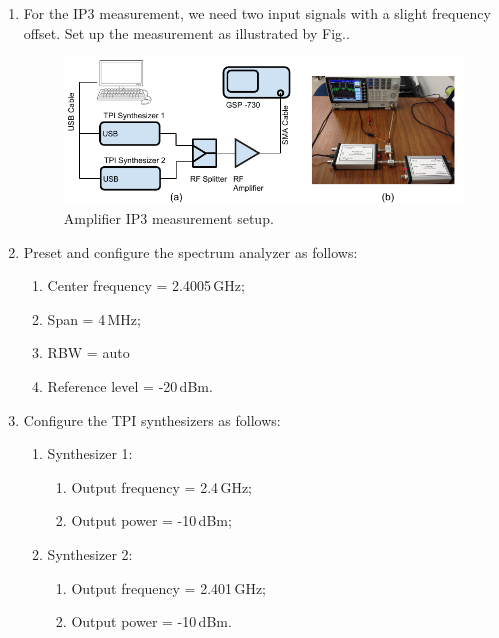 \documentclass[letterpaper, 11pt]{article}
\begin{document}
\begin{enumerate}
	\item For the IP3 measurement, we need two input signals with a slight frequency offset. Set up the measurement as illustrated by Fig..
		\begin{figure}[h]
			\centering
			\includegraphics[width=4.5in]{setup-two-tone-amp}
			\caption{Amplifier IP3 measurement setup.}
			\label{fig:setup-two-tone-amp}
		\end{figure}
	
	\item Preset and configure the spectrum analyzer as follows:
		\begin{enumerate}
			\item Center frequency = 2.4005\,GHz;
			\item Span = 4\,MHz;
			\item RBW = auto
			\item Reference level = -20\,dBm.
		\end{enumerate}
	
	\item Configure the TPI synthesizers as follows:
		\begin{enumerate}
			\item Synthesizer 1:
				\begin{enumerate}
					\item Output frequency = 2.4\,GHz;
					\item Output power = -10\,dBm;
				\end{enumerate}
			\item Synthesizer 2:
				\begin{enumerate}
					\item Output frequency = 2.401\,GHz;
					\item Output power = -10\,dBm.
				\end{enumerate}
		\end{enumerate}
	

\end{enumerate}
\end{document}
